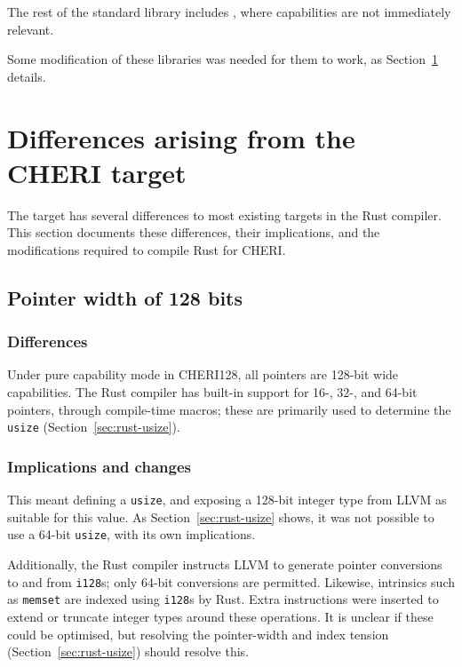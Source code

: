 \documentclass[dissertation.tex]{subfiles}
\begin{document}
The rest of the standard library includes ,
where capabilities are not immediately relevant.

Some modification of these libraries was needed for them to work, as
Section~\ref{sec:impl-divergences} details. 


\section{Differences arising from the CHERI target}
\label{sec:impl-divergences}

The \cuf target has several differences to most existing targets in the
Rust compiler.
This section documents these differences, their implications, and the
modifications required to compile Rust for CHERI.


\subsection{Pointer width of 128 bits}
\label{sec:impl-width}

\subsubsection{Differences}
Under pure capability mode in CHERI128, all pointers are 128-bit wide
capabilities.
The Rust compiler has built-in support for 16-, 32-, and 64-bit
pointers, through compile-time macros; these are primarily used to
determine the \texttt{usize} (Section~\ref{sec:rust-usize}).

\subsubsection{Implications and changes}
This meant defining a \texttt{usize}, and exposing a 128-bit integer
type from LLVM as suitable for this value.
As Section~\ref{sec:rust-usize} shows, it was not possible to use a
64-bit \texttt{usize}, with its own implications.

Additionally, the Rust compiler instructs LLVM to generate
pointer conversions to and from \texttt{i128}s; only 64-bit conversions
are permitted.
Likewise, intrinsics such as \texttt{memset} are indexed using
\texttt{i128}s by Rust.
Extra instructions were inserted to extend or truncate integer types
around these operations.
It is unclear if these could be optimised, but resolving the
pointer-width and index tension (Section~\ref{sec:rust-usize}) should
resolve this.
\end{document}
